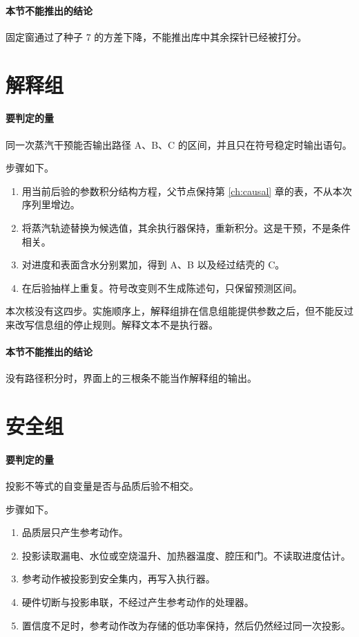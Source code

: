 \paragraph{本节不能推出的结论}
固定窗通过了种子 7 的方差下降，不能推出库中其余探针已经被打分。

\section{解释组}

\paragraph{要判定的量}
同一次蒸汽干预能否输出路径 A、B、C 的区间，并且只在符号稳定时输出语句。

步骤如下。

\begin{enumerate}
\item 用当前后验的参数积分结构方程，父节点保持第 \ref{ch:causal} 章的表，不从本次序列里增边。
\item 将蒸汽轨迹替换为候选值，其余执行器保持，重新积分。这是干预，不是条件相关。
\item 对进度和表面含水分别累加，得到 A、B 以及经过结壳的 C。
\item 在后验抽样上重复。符号改变则不生成陈述句，只保留预测区间。
\end{enumerate}

本次核没有这四步。实施顺序上，解释组排在信息组能提供参数之后，但不能反过来改写信息组的停止规则。解释文本不是执行器。

\paragraph{本节不能推出的结论}
没有路径积分时，界面上的三根条不能当作解释组的输出。

\section{安全组}

\paragraph{要判定的量}
投影不等式的自变量是否与品质后验不相交。

步骤如下。

\begin{enumerate}
\item 品质层只产生参考动作。
\item 投影读取漏电、水位或空烧温升、加热器温度、腔压和门。不读取进度估计。
\item 参考动作被投影到安全集内，再写入执行器。
\item 硬件切断与投影串联，不经过产生参考动作的处理器。
\item 置信度不足时，参考动作改为存储的低功率保持，然后仍然经过同一次投影。
\end{enumerate}

